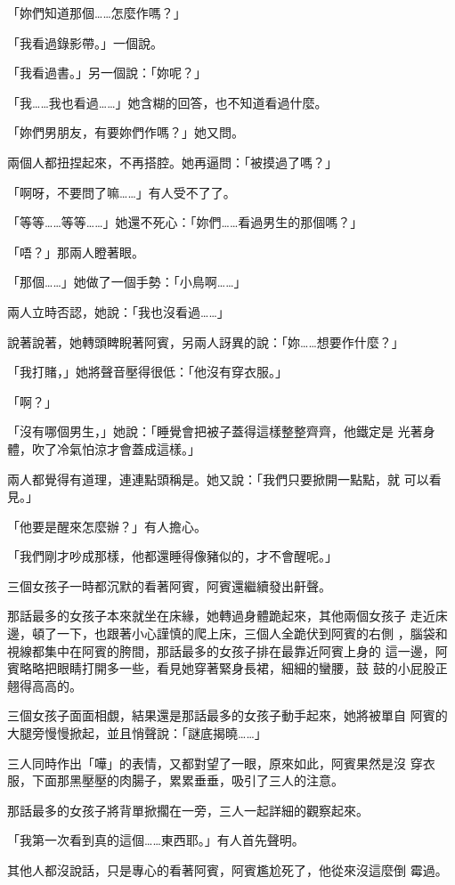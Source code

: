「妳們知道那個……怎麼作嗎？」

「我看過錄影帶。」一個說。

「我看過書。」另一個說：「妳呢？」

「我……我也看過……」她含糊的回答，也不知道看過什麼。

「妳們男朋友，有要妳們作嗎？」她又問。

兩個人都扭捏起來，不再搭腔。她再逼問：「被摸過了嗎？」

「啊呀，不要問了嘛……」有人受不了了。

「等等……等等……」她還不死心：「妳們……看過男生的那個嗎？」

「唔？」那兩人瞪著眼。

「那個……」她做了一個手勢：「小鳥啊……」

兩人立時否認，她說：「我也沒看過……」

說著說著，她轉頭睥睨著阿賓，另兩人訝異的說：「妳……想要作什麼？」

「我打賭，」她將聲音壓得很低：「他沒有穿衣服。」

「啊？」

「沒有哪個男生，」她說：「睡覺會把被子蓋得這樣整整齊齊，他鐵定是
光著身體，吹了冷氣怕涼才會蓋成這樣。」

兩人都覺得有道理，連連點頭稱是。她又說：「我們只要掀開一點點，就
可以看見。」

「他要是醒來怎麼辦？」有人擔心。

「我們剛才吵成那樣，他都還睡得像豬似的，才不會醒呢。」

三個女孩子一時都沉默的看著阿賓，阿賓還繼續發出鼾聲。

那話最多的女孩子本來就坐在床緣，她轉過身體跪起來，其他兩個女孩子
走近床邊，頓了一下，也跟著小心謹慎的爬上床，三個人全跪伏到阿賓的右側
，腦袋和視線都集中在阿賓的胯間，那話最多的女孩子排在最靠近阿賓上身的
這一邊，阿賓略略把眼睛打開多一些，看見她穿著緊身長裙，細細的蠻腰，鼓
鼓的小屁股正翹得高高的。

三個女孩子面面相覷，結果還是那話最多的女孩子動手起來，她將被單自
阿賓的大腿旁慢慢掀起，並且悄聲說：「謎底揭曉……」

三人同時作出「嘩」的表情，又都對望了一眼，原來如此，阿賓果然是沒
穿衣服，下面那黑壓壓的肉腸子，累累垂垂，吸引了三人的注意。

那話最多的女孩子將背單掀擱在一旁，三人一起詳細的觀察起來。

「我第一次看到真的這個……東西耶。」有人首先聲明。

其他人都沒說話，只是專心的看著阿賓，阿賓尷尬死了，他從來沒這麼倒
霉過。

